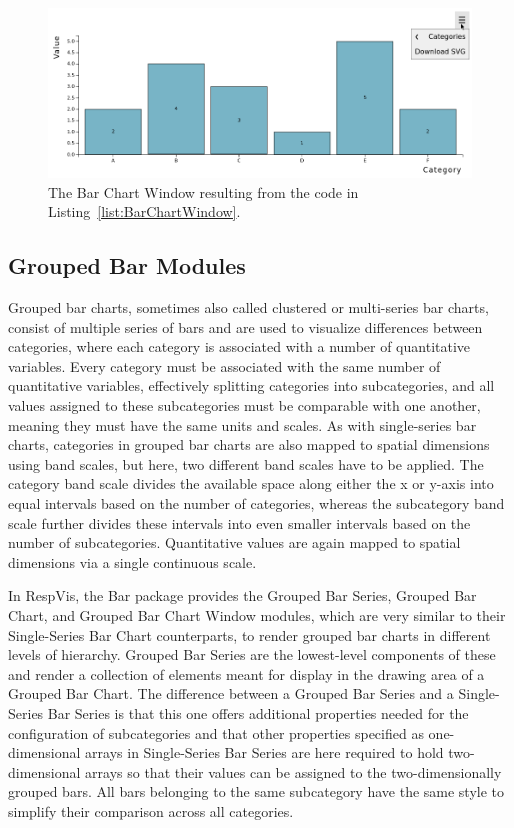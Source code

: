 \begin{figure}[tp]
\centering
\includegraphics[keepaspectratio,width=\linewidth,height=\halfh]
{images/bar-chart-window.png}
\caption[Bar Chart Window Example]{%
The Bar Chart Window resulting from the code in
Listing~\ref{list:BarChartWindow}.
}
\label{fig:BarChartWindow}
\end{figure}






\subsection{Grouped Bar Modules}

Grouped bar charts, sometimes also called clustered or multi-series
bar charts, consist of multiple series of bars and are used to
visualize differences between categories, where each category is
associated with a number of quantitative variables. Every category
must be associated with the same number of quantitative variables,
effectively splitting categories into subcategories, and all values
assigned to these subcategories must be comparable with one another,
meaning they must have the same units and scales. As with
single-series bar charts, categories in grouped bar charts are also
mapped to spatial dimensions using band scales, but here, two
different band scales have to be applied. The category band scale
divides the available space along either the x or y-axis into equal
intervals based on the number of categories, whereas the subcategory
band scale further divides these intervals into even smaller intervals
based on the number of subcategories. Quantitative values are again
mapped to spatial dimensions via a single continuous scale.

In RespVis, the Bar package provides the Grouped Bar Series,
Grouped Bar Chart, and Grouped Bar Chart Window modules, which are
very similar to their Single-Series Bar Chart counterparts, to render
grouped bar charts in different levels of hierarchy. Grouped Bar
Series are the lowest-level components of these and render a
collection of  elements meant for display in the drawing
area of a Grouped Bar Chart. The difference between a Grouped Bar
Series and a Single-Series Bar Series is that this one offers
additional properties needed for the configuration of subcategories
and that other properties specified as one-dimensional arrays in
Single-Series Bar Series are here required to hold two-dimensional
arrays so that their values can be assigned to the two-dimensionally
grouped bars. All bars belonging to the same subcategory have the same
style to simplify their comparison across all categories. 

